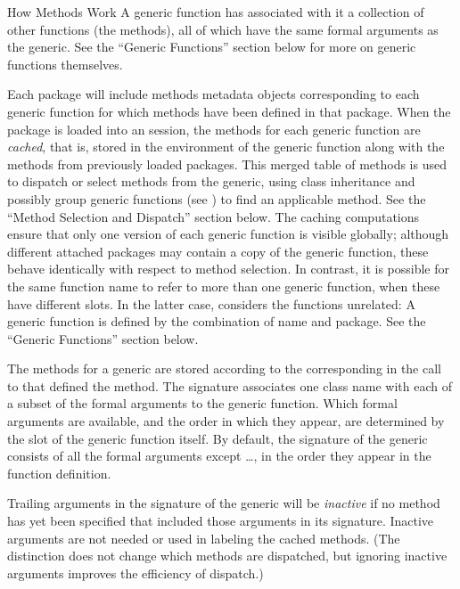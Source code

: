 %
\begin{Section}{How Methods Work}
A generic function  has associated with it a
collection of other functions (the methods), all of which have the same
formal arguments as the generic.  See the ``Generic
Functions'' section below for more on generic functions themselves.

Each \R{} package will include  methods metadata objects
corresponding to each generic function  for which methods have been
defined in that package.
When the package is loaded into an \R{} session, the methods for each
generic function are \emph{cached}, that is, stored in the
environment of the generic function along with the methods from
previously loaded packages.  This merged table of methods is used to
dispatch or select methods from the generic, using class inheritance
and possibly group generic functions (see
) to find an applicable method.
See the ``Method Selection and Dispatch'' section below.
The caching computations ensure that only one version of each
generic function is visible globally; although different attached
packages may contain a copy of the generic function, these behave
identically with respect to method selection.
In contrast, it is possible for the same function name to refer to
more than one generic function, when these have different
 slots.  In the latter case, \R{} considers the
functions unrelated:  A generic function is defined by the
combination of name and package.  See the ``Generic Functions''
section below.

The methods for a generic are stored according to the
corresponding  in the call to 
that defined  the method.  The signature associates one
class name with each of a subset of the formal arguments to the
generic function.  Which formal arguments are available, and the
order in which they appear, are determined by the 
slot of the generic function itself.  By default, the signature of the
generic consists of all the formal arguments except \dots, in the
order they appear in the function definition.

Trailing arguments in the signature of the generic will be \emph{inactive}  if no
method has yet been specified that included those arguments in its signature.
Inactive arguments are not needed or used in labeling the cached
methods.  (The distinction does not change which methods are
dispatched, but ignoring inactive arguments improves the
efficiency of dispatch.)


\end{Section}
